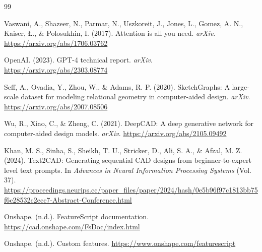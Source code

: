 \begin{thebibliography}{99}

Vaswani, A., Shazeer, N., Parmar, N., Uszkoreit, J., Jones, L., Gomez, A. N., Kaiser, {\L}., \& Polosukhin, I. (2017). Attention is all you need. \textit{arXiv}. \url{https://arxiv.org/abs/1706.03762}

OpenAI. (2023). GPT-4 technical report. \textit{arXiv}. \url{https://arxiv.org/abs/2303.08774}

Seff, A., Ovadia, Y., Zhou, W., \& Adams, R. P. (2020). SketchGraphs: A large-scale dataset for modeling relational geometry in computer-aided design. \textit{arXiv}. \url{https://arxiv.org/abs/2007.08506}

Wu, R., Xiao, C., \& Zheng, C. (2021). DeepCAD: A deep generative network for computer-aided design models. \textit{arXiv}. \url{https://arxiv.org/abs/2105.09492}

Khan, M. S., Sinha, S., Sheikh, T. U., Stricker, D., Ali, S. A., \& Afzal, M. Z. (2024). Text2CAD: Generating sequential CAD designs from beginner-to-expert level text prompts. In \textit{Advances in Neural Information Processing Systems} (Vol. 37). \url{https://proceedings.neurips.cc/paper_files/paper/2024/hash/0e5b96f97c1813bb75f6c28532c2ecc7-Abstract-Conference.html}

Onshape. (n.d.). FeatureScript documentation. \url{https://cad.onshape.com/FsDoc/index.html}

Onshape. (n.d.). Custom features. \url{https://www.onshape.com/featurescript}

\end{thebibliography}
